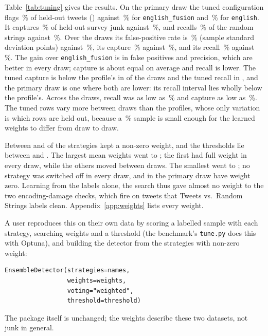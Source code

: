 \documentclass[10pt,twocolumn]{article}
\newcommand{\code}[1]{\texttt{#1}}
\newcommand{\TRS}{Tweets vs.\ Random Strings}
\begin{document}
Table~\ref{tab:tuning} gives the results. On the primary draw the tuned
configuration flags \,\% of held-out tweets
() against \,\% for
\code{english\_fusion} and \,\% for
\code{english}. It captures \,\% of held-out
survey junk against \,\%, and recalls
\,\% of the random strings against
\,\%. Over the \tuningdraws{} draws its
false-positive rate is \,\% (sample standard deviation
 points) against \,\%,
its capture \,\% against
\,\%, and its recall
\,\% against
\,\%. The gain over
\code{english\_fusion} is in false positives and precision, which are
better in every draw; capture is about equal on average and recall is
lower. The tuned capture is below the profile's in
\tuningcapturelower{} of the \tuningdraws{} draws and the tuned recall in
\tuningrecalllower{}, and the primary draw is one where both are lower:
its recall interval lies wholly below the profile's. Across the draws,
recall was as low as \tuningworstrecall\,\% and capture as low as
\tuningworstcapture\,\%. The tuned rows vary more between draws than the
profiles, whose only variation is which rows are held out, because a
\tuningpct\,\% sample is small enough for the learned weights to differ
from draw to draw.

Between \tuningmembersmin{} and \tuningmembersmax{} of the
\nstrategies{} strategies kept a non-zero weight, and the thresholds lie
between \tuningthresholdmin{} and \tuningthresholdmax{}. The largest mean
weights went to \tuningtop{}; the first had full weight in every draw,
while the others moved between draws. The smallest went to
\tuningbottom{}; no strategy was switched off in every draw, and in the
primary draw \tuningoff{} have weight zero. Learning from the labels alone, the search
thus gave almost no weight to the two encoding-damage checks, which fire
on tweets that \TRS{} labels clean. Appendix~\ref{app:weights} lists every weight.

A user reproduces this on their own data by scoring a labelled sample
with each strategy, searching weights and a threshold (the benchmark's
\code{tune.py} does this with Optuna), and building the detector from the
strategies with non-zero weight:
\begin{small}
\begin{verbatim}
EnsembleDetector(strategies=names,
                 weights=weights,
                 voting="weighted",
                 threshold=threshold)
\end{verbatim}
\end{small}
The package itself is unchanged; the weights describe these two datasets,
not junk in general.
\end{document}
